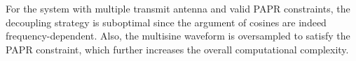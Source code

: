 For the system with multiple transmit antenna and valid PAPR constraints, the decoupling strategy is suboptimal since the argument of cosines are indeed frequency-dependent. Also, the multisine waveform is oversampled to satisfy the PAPR constraint, which further increases the overall computational complexity. 